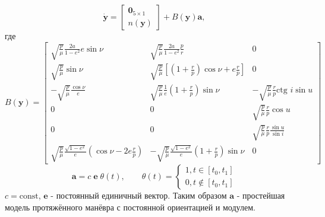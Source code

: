 \documentclass[12pt,a4paper]{extarticle}
\begin{document}
\begin{equation*}
    \dot{\mathbf{y}} = 
    \begin{bmatrix}
        \mathbf{0}_{5 \times 1} \\
        n(\mathbf{y})
    \end{bmatrix}
    +
    B(\mathbf{y}) \mathbf{a},
\end{equation*}
где 
\begin{equation*}
    B(\mathbf{y}) = 
    \begin{bmatrix}
        \sqrt{\frac{p}{\mu}} \frac{2a}{1 - e^2} e \sin \nu &
        \sqrt{\frac{p}{\mu}} \frac{2a}{1 - e^2} \frac{p}{r} & 
        0 \\
    
        \sqrt{\frac{p}{\mu}} \sin \nu &
        \sqrt{\frac{p}{\mu}} \left[ \left(1 + \frac{r}{p} \right) \cos \nu + e \frac{r}{p} \right] & 
        0 \\
    
        -\sqrt{\frac{p}{\mu}} \frac{\cos \nu}{e} &
        \sqrt{\frac{p}{\mu}} \frac{1}{e} \left(1 + \frac{r}{p} \right) \sin \nu &
        -\sqrt{\frac{p}{\mu}} \frac{r}{p} \text{ctg } i \sin u \\
    
        0 &
        0 &
        \sqrt{\frac{p}{\mu}} \frac{r}{p} \cos u \\
    
        0 & 
        0 &
        \sqrt{\frac{p}{\mu}} \frac{r}{p} \frac{\sin u}{\sin i} \\
    
        \sqrt{\frac{p}{\mu}} \frac{\sqrt{1 - e^2}}{e} \left( \cos \nu - 2e \frac{r}{p} \right) &
        -\sqrt{\frac{p}{\mu}} \frac{\sqrt{1 - e^2}}{e} \left(1 + \frac{r}{p} \right) \sin \nu &
        0
    \end{bmatrix}
\end{equation*}
\begin{equation*}
    \mathbf{a} = c \; \mathbf{e} \; \theta(t), \quad \quad
    \theta(t) = 
    \begin{cases}
        1, t \in [t_0, t_1] \\
        0, t \notin [t_0, t_1]
    \end{cases}
\end{equation*}
$c = \text{const}$, $\mathbf{e}$ - постоянный единичный вектор. Таким образом $\mathbf{a}$ - простейшая модель протяжённого манёвра с постоянной ориентацией и модулем. 
\end{document}
